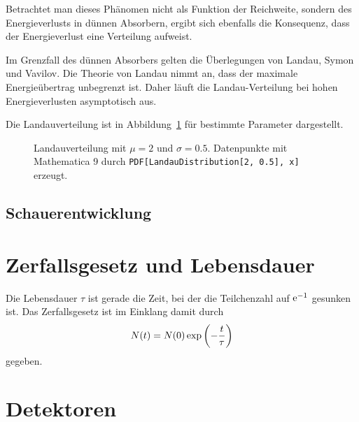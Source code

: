 \documentclass[11pt, ngerman, fleqn, DIV=15, headinclude, BCOR=2cm]{scrreprt}
\begin{document}
Betrachtet man dieses Phänomen nicht als Funktion der Reichweite, sondern des
Energieverlusts in dünnen Absorbern, ergibt sich ebenfalls die Konsequenz, dass
der Energieverlust eine Verteilung aufweist.
\parencite[§2.6]{Leo/Techniques_Nuclear_Experiments}

Im Grenzfall des dünnen Absorbers gelten die Überlegungen von Landau, Symon und
Vavilov. Die Theorie von Landau nimmt an, dass der maximale Energieübertrag
unbegrenzt ist. Daher läuft die Landau-Verteilung bei hohen Energieverlusten
asymptotisch aus. \parencite[§2.6.3]{Leo/Techniques_Nuclear_Experiments}

Die Landauverteilung ist in Abbildung~\ref{fig:landau-plot} für bestimmte
Parameter dargestellt.

\begin{figure}[htbp]
    \centering
    \caption{%
        Landauverteilung mit $\mu = \num{2}$ und $\sigma = \num{0.5}$.
        Datenpunkte mit Mathematica 9 durch \texttt{PDF[LandauDistribution[2,
        0.5], x]} erzeugt.
    }
    \label{fig:landau-plot}
\end{figure}

\subsection{Schauerentwicklung}


\section{Zerfallsgesetz und Lebensdauer}

Die Lebensdauer $\tau$ ist gerade die Zeit, bei der die Teilchenzahl auf
$\mathrm e^{-1}$ gesunken ist. Das Zerfallsgesetz ist im Einklang damit durch
\[
    N(t) = N(0) \exp\del{- \frac t\tau}
\]
gegeben.

\section{Detektoren}
\end{document}
